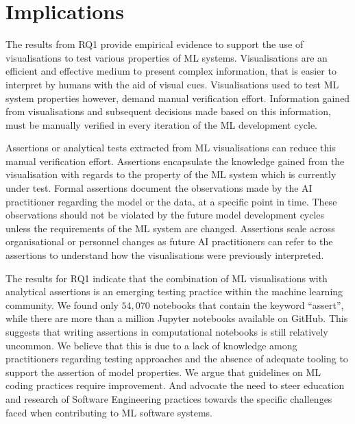 \section{Implications}\label{sec:discuss}


The results from RQ1 provide empirical evidence to support the use of
visualisations to test various properties of ML systems.
Visualisations are an efficient and effective medium to present
complex information, that is easier to interpret by humans with the
aid of visual cues. Visualisations used to test ML system properties
however, demand manual verification effort. Information gained from
visualisations and subsequent decisions made based on this
information, must be manually verified in every iteration of the ML
development cycle.


Assertions or analytical tests extracted from ML visualisations can
reduce this manual verification effort. Assertions encapsulate the
knowledge gained from the visualisation with regards to the property
of the ML system which is currently under test. Formal assertions
document the observations made by the AI practitioner regarding the
model or the data, at a specific point in time. These observations
should not be violated by the future model development cycles unless
the requirements of the ML system are changed. Assertions scale across
organisational or personnel changes as future AI practitioners can
refer to the assertions to understand how the visualisations were
previously interpreted.

The results for RQ1 indicate that the combination of ML visualisations
with analytical assertions is an emerging testing practice within the
machine learning community. We found only $54,070$ notebooks that
contain the keyword ``assert'', while there are more than a million
Jupyter notebooks available on GitHub. This suggests that writing
assertions in computational notebooks is still relatively uncommon. We
believe that this is due to a lack of knowledge among practitioners
regarding testing approaches and the absence of adequate tooling to
support the assertion of model properties. We argue that guidelines on
ML coding practices require improvement. And advocate the need to
steer education and research of Software Engineering practices towards
the specific challenges faced when contributing to ML software
systems.

